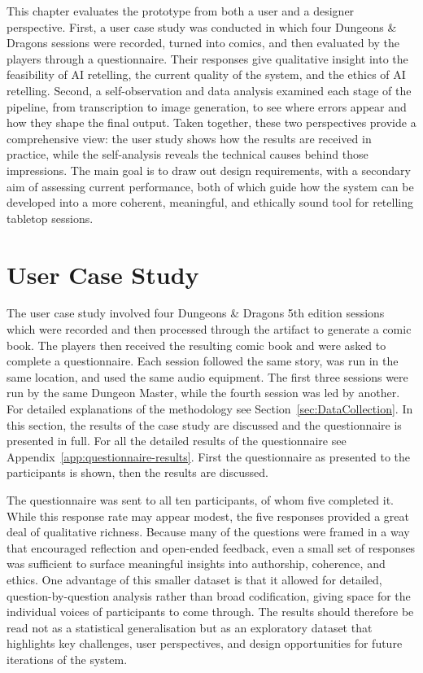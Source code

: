 \label{sec:Evaluation}
This chapter evaluates the prototype from both a user and a designer perspective. First, a user case study was conducted in which four Dungeons \& Dragons sessions were recorded, turned into comics, and then evaluated by the players through a questionnaire. Their responses give qualitative insight into the feasibility of AI retelling, the current quality of the system, and the ethics of AI retelling. Second, a self-observation and data analysis examined each stage of the pipeline, from transcription to image generation, to see where errors appear and how they shape the final output. Taken together, these two perspectives provide a comprehensive view: the user study shows how the results are received in practice, while the self-analysis reveals the technical causes behind those impressions. The main goal is to draw out design requirements, with a secondary aim of assessing current performance, both of which guide how the system can be developed into a more coherent, meaningful, and ethically sound tool for retelling tabletop sessions.

\section{User Case Study}

The user case study involved four Dungeons \& Dragons 5th edition sessions which were recorded and then processed through the artifact to generate a comic book. The players then received the resulting comic book and were asked to complete a questionnaire. Each session followed the same story, was run in the same location, and used the same audio equipment. The first three sessions were run by the same Dungeon Master, while the fourth session was led by another. For detailed explanations of the methodology see Section~\ref{sec:DataCollection}. In this section, the results of the case study are discussed and the questionnaire is presented in full. For all the detailed results of the questionnaire see Appendix~\ref{app:questionnaire-results}. First the questionnaire as presented to the participants is shown, then the results are discussed.  

The questionnaire was sent to all ten participants, of whom five completed it. While this response rate may appear modest, the five responses provided a great deal of qualitative richness. Because many of the questions were framed in a way that encouraged reflection and open-ended feedback, even a small set of responses was sufficient to surface meaningful insights into authorship, coherence, and ethics. One advantage of this smaller dataset is that it allowed for detailed, question-by-question analysis rather than broad codification, giving space for the individual voices of participants to come through. The results should therefore be read not as a statistical generalisation but as an exploratory dataset that highlights key challenges, user perspectives, and design opportunities for future iterations of the system.

